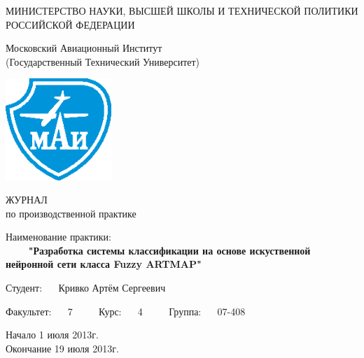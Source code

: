 \begin{titlepage}
\newpage

\begin{center}
	МИНИСТЕРСТВО НАУКИ, ВЫСШЕЙ ШКОЛЫ И ТЕХНИЧЕСКОЙ ПОЛИТИКИ РОССИЙСКОЙ ФЕДЕРАЦИИ
\end{center}


\begin{center}
	Московский Авиационный Институт\\
	(Государственный Технический Университет)
\end{center}

\vspace{2em}

\begin{center}
	\includegraphics[width=4cm]{mai.eps}
\end{center}

\begin{center}
	\large ЖУРНАЛ\\
	\large по производственной практике
\end{center}

\vspace{2em}


\begin{flushleft}
	Наименование практики: \\
	$\qquad$ \textbf{"Разработка системы классификации на основе искуственной нейронной сети класса Fuzzy ARTMAP"}
\end{flushleft}

\vspace{2em}

\begin{flushleft}
	Студент: $\quad$ Кривко Артём Сергеевич
\end{flushleft}

\vspace{2em}


\begin{flushleft}
	Факультет: $\quad$ 7 $\qquad$	Курс: $\quad$ 4 $\qquad$	Группа: $\quad$ 07-408 
\end{flushleft}


\vspace{4em}

\begin{center}
Начало 1 июля 2013г.\\
Окончание 19 июля 2013г.
\end{center}

\vspace{\fill}


\end{titlepage}
